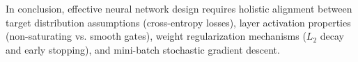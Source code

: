\documentclass[12pt]{article}
\begin{document}
In conclusion, effective neural network design requires holistic alignment between target distribution assumptions (cross-entropy losses), layer activation properties (non-saturating vs. smooth gates), weight regularization mechanisms ($L_2$ decay and early stopping), and mini-batch stochastic gradient descent.
\end{document}
